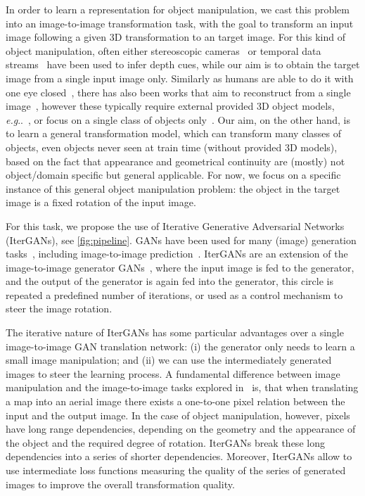 \documentclass[runningheads]{llncs}
\makeatletter
\DeclareRobustCommand\onedot{\futurelet\@let@token\@onedot}
\def\@onedot{\ifx\@let@token.\else.\null\fi\xspace}
\def\eg{\emph{e.g}\onedot} \def\Eg{\emph{E.g}\onedot}
\makeatother
\begin{document}
In order to learn a representation for object manipulation, we cast this problem into an image-to-image transformation task, with the goal to transform an input image following a given 3D transformation to an target image.
For this kind of object manipulation, often either stereoscopic cameras~\cite{ko20072d,bruno20103d} or temporal data streams~\cite{pollefeys2008detailed,gibson2003interactive} have been used to infer depth cues, while our aim is to obtain the target image from a single input image only. 
Similarly as humans are able to do it with one eye closed~\cite{vishwanath2013seeing}, there has also been works that aim to reconstruct from a single image~\cite{saxena2009make3d,rematas2016novel}, however these typically require external provided 3D object models, \eg~\cite{vicente2013balloon}, or focus on a single class of objects only~\cite{park17cvpr}. 
Our aim, on the other hand, is to learn a general transformation model, which can transform many classes of objects, even objects never seen at train time (without provided 3D models), based on the fact that appearance and geometrical continuity are (mostly) not object/domain specific but general applicable.
For now, we focus on a specific instance of this general object manipulation problem: the object in the target image is a fixed rotation of the input image.

For this task, we propose the use of Iterative Generative Adversarial Networks (IterGANs), see \autoref{fig:pipeline}.
GANs have been used for many (image) generation tasks~\cite{reed2016generative,denton2015deep,radford2015unsupervised}, including image-to-image prediction~\cite{pix2pix2016,Zhu_2017_ICCV}. 
IterGANs are an extension of the image-to-image generator GANs~\cite{pix2pix2016}, where the input image is fed to the generator, and the output of the generator is again fed into the generator, this circle is repeated a predefined number of iterations, or used as a control mechanism to steer the image rotation. 

The iterative nature of IterGANs has some particular advantages over a single image-to-image GAN translation network:
(i) the generator only needs to learn a small image manipulation; and (ii) we can use the intermediately generated images to steer the learning process.
A fundamental difference between image manipulation and the image-to-image tasks explored in~\cite{pix2pix2016} is, that when translating a map into an aerial image there exists a one-to-one pixel relation between the input and the output image. In the case of object manipulation, however, pixels have long range dependencies, depending on the geometry and the appearance of the object and the required degree of rotation.
IterGANs break these long dependencies into a series of shorter dependencies. 
Moreover, IterGANs allow to use intermediate loss functions measuring the quality of the series of generated images to improve the overall transformation quality.
\end{document}

